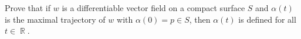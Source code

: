 \documentclass[12pt,letterpaper]{hmcpset}
\DeclareMathOperator{\R}{\mathbb{R}}
\begin{document}
\begin{problem}
\\ \\
Prove that if $w$ is a differentiable vector field on a compact surface $S$ and $\alpha(t)$ is the maximal trajectory of $w$ with $\alpha(0) = p \in S$, then $\alpha(t)$ is defined for all $t\in \R$. 
\end{problem}
\begin{solution}
\end{solution}
\end{document}
